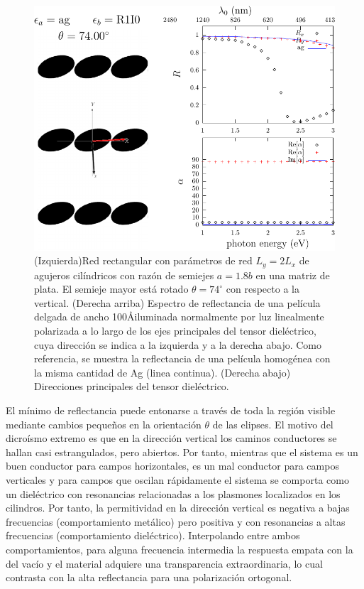 \documentclass[12pt]{article}
\begin{document}
\begin{figure}
  \centering
  \includegraphics[width=.8\textwidth]{cu-epsa-ag-epsb-R1I0-s-1-15_75}
  \caption{(Izquierda)Red rectangular con parámetros de red $L_y=2L_x$ de
    agujeros cilíndricos con razón de semiejes $a=1.8b$ en una matriz
    de plata. El semieje mayor está rotado $\theta=74^\circ$ con
    respecto a la vertical. (Derecha arriba) Espectro de reflectancia
    de una película delgada de ancho 100\AA iluminada normalmente por
    luz linealmente polarizada a lo largo de los ejes principales del
    tensor dieléctrico, cuya dirección se indica a la izquierda y a la
    derecha abajo. Como referencia, se muestra la reflectancia de una
    película homogénea con la misma cantidad de Ag (linea
    continua). (Derecha abajo) Direcciones principales del tensor
    dieléctrico.}
  \label{fig:elipses}
\end{figure}
El mínimo de reflectancia puede entonarse a través de toda la región
visible mediante cambios pequeños en la orientación $\theta$ de las
elipses. El motivo del dicroísmo extremo es que en la dirección
vertical los caminos conductores se hallan casi estrangulados, pero
abiertos. Por tanto, mientras que el sistema es un buen conductor para
campos horizontales, es un mal conductor para campos verticales y para
campos que oscilan rápidamente el sistema se comporta como un
dieléctrico con resonancias relacionadas a los plasmones localizados
en los cilindros. Por tanto, la permitividad en la dirección vertical
es negativa a bajas frecuencias (comportamiento metálico) pero
positiva y con resonancias a altas frecuencias (comportamiento
dieléctrico). Interpolando entre ambos comportamientos, para alguna
frecuencia intermedia la respuesta empata con la del vacío y el
material adquiere una transparencia extraordinaria, lo cual contrasta
con la alta reflectancia para una polarización ortogonal.
\end{document}
